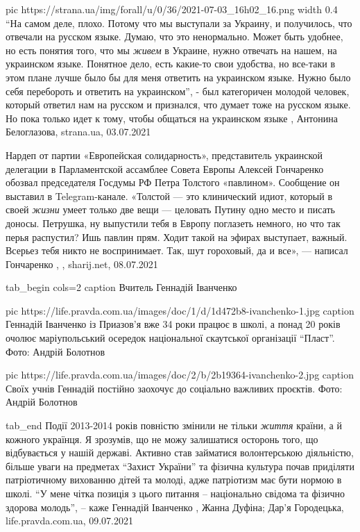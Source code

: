 \ifcmt
  pic https://strana.ua/img/forall/u/0/36/2021-07-03_16h02_16.png
  width 0.4
\fi
\enquote{На самом деле, плохо. Потому что мы выступали за Украину, и получилось, что
отвечали на русском языке. Думаю, что это ненормально. Может быть удобнее, но
есть понятия того, что мы \emph{живем} в Украине, нужно отвечать на нашем, на
украинском языке. Понятное дело, есть какие-то свои удобства, но все-таки в
этом плане лучше было бы для меня ответить на украинском языке. Нужно было себя
перебороть и ответить на украинском}, - был категоричен молодой человек,
который ответил нам на русском и признался, что думает тоже на русском языке.
Но пока только идет к тому, чтобы общаться на украинском языке
, 
Антонина Белоглазова, strana.ua, 03.07.2021


Нардеп от партии «Европейская солидарность», представитель украинской делегации
в Парламентской ассамблее Совета Европы Алексей Гончаренко обозвал председателя
Госдумы РФ Петра Толстого «павлином». Сообщение он выставил в Telegram-канале.
«Толстой — это клинический идиот, который в своей \emph{жизни} умеет только две вещи —
целовать Путину одно место и писать доносы. Петрушка, ну выпустили тебя в
Европу поглазеть немного, но что так перья распустил? Ишь павлин прям. Ходит
такой на эфирах выступает, важный. Всерьез тебя никто не воспринимает. Так, шут
гороховый, да и все», — написал Гончаренко
, 
, sharij.net, 08.07.2021

\ifcmt
  tab_begin cols=2
     caption Вчитель Геннадій Іванченко

     pic https://life.pravda.com.ua/images/doc/1/d/1d472b8-ivanchenko-1.jpg
     caption Геннадій Іванченко із Приазов'я вже 34 роки працює в школі, а понад 20 років очолює маріупольський осередок національної скаутської організації \enquote{Пласт}. Фото: Андрій Болотнов

     pic https://life.pravda.com.ua/images/doc/2/b/2b19364-ivanchenko-2.jpg
     caption Своїх учнів Геннадій постійно заохочує до соціально важливих проєктів. Фото: Андрій Болотнов

  tab_end
\fi
Події 2013-2014 років повністю змінили не тільки \emph{життя} країни, а й кожного
українця. Я зрозумів, що не можу залишатися осторонь того, що відбувається у
нашій державі.  Активно став займатися волонтерською діяльністю, більше уваги
на предметах \enquote{Захист України} та фізична культура почав приділяти патріотичному
вихованню дітей та молоді, адже патріотизм має бути нормою в школі.  \enquote{У мене
чітка позиція з цього питання – національно свідома та фізично здорова молодь},
– каже Геннадій Іванченко
, 
Жанна Дуфіна; Дар'я Городецька, life.pravda.com.ua, 09.07.2021
